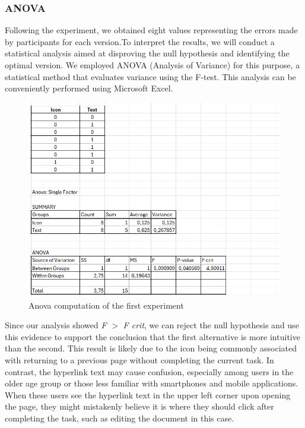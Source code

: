 		\subsubsection{ANOVA}
			Following the experiment, we obtained eight values representing the errors made by participants for each version.To interpret the results, we will conduct a statistical analysis aimed at disproving the null hypothesis and identifying the optimal version. We employed ANOVA (Analysis of Variance) for this purpose, a statistical method that evaluates variance using the F-test. This analysis can be conveniently performed using Microsoft Excel.\\
			\begin{figure}[htbp]
				\centering
				\includegraphics[width=1\textwidth]{../Draw.io diagrams/anova_icon_text_better.png}  %
				\caption{Anova computation of the first experiment}
			\end{figure}
			
			\noindent
			Since our analysis showed \textit{F} \(>\) \textit{F crit}, we can reject the null hypothesis and use this evidence to support the conclusion that the first alternative is more intuitive than the second. This result is likely due to the icon being commonly associated with returning to a previous page without completing the current task. In contrast, the hyperlink text may cause confusion, especially among users in the older age group or those less familiar with smartphones and mobile applications.\\ When these users see the hyperlink text in the upper left corner upon opening the page, they might mistakenly believe it is where they should click after completing the task, such as editing the document in this case.
			\clearpage
